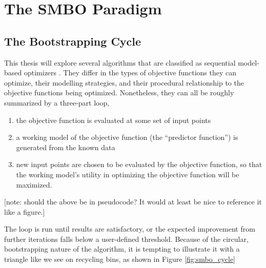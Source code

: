 \chapter{The SMBO Paradigm}\label{ch:smbo}

\section{The Bootstrapping Cycle}

This thesis will explore several algorithms that are classified as sequential model-based optimizers \cite{hutter_sequential_2011, hamadi_autonomous_2012, jones_efficient_1998, rasmussen_gaussian_2006}. %
They differ in the types of objective functions they can optimize, their modelling strategies, and their procedural relationship to the objective functions being optimized. %
Nonetheless, they can all be roughly summarized by a three-part loop,

\begin{minipage}{\textwidth}
\begin{framed}

\begin{enumerate} 
\item the objective function is evaluated at some set of input points
\item a working model of the objective function (the ``predictor function'') is generated from the known data
\item new input points are chosen to be evaluated by the objective function, so that the working model's utility in optimizing the objective function will be maximized.
\end{enumerate}
\end{framed}

\label{fig:smbo_loop}
\end{minipage}


[note: should the above be in pseudocode? It would at least be nice to reference it like a figure.]

The loop is run until results are satisfactory, or the expected improvement from further iterations falls below a user-defined threshold. Because of the circular, bootstrapping nature of the algorithm, it is tempting to illustrate it with a triangle like we see on recycling bins, as shown in Figure \ref{fig:smbo_cycle}


